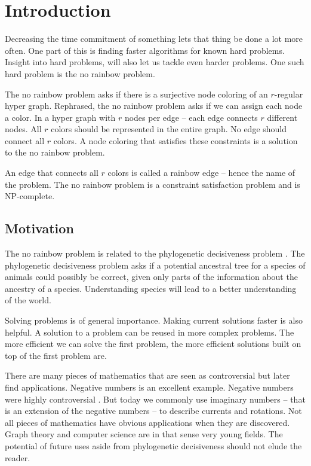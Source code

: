 \documentclass[msc,lith,english]{liuthesis}
\author{Edvard Thörnros}
\begin{document}
\chapter{Introduction}
\label{chaIntro}
Decreasing the time commitment of something lets that thing be done a lot more often.
One part of this is finding faster algorithms for known hard problems.
Insight into hard problems, will also let us tackle even harder problems.
One such hard problem is the no rainbow problem.

The no rainbow problem \cite{sourceNoRainbow} asks if there is a surjective node coloring of an $r$-regular hyper graph.
Rephrased, the no rainbow problem asks if we can assign each node a color.
In a hyper graph with $r$ nodes per edge -- each edge connects $r$ different nodes.
All $r$ colors should be represented in the entire graph.
No edge should connect all $r$ colors.
A node coloring that satisfies these constraints is a solution to the no rainbow problem.

An edge that connects all $r$ colors is called a rainbow edge -- hence the name of the problem.
The no rainbow problem is a constraint satisfaction problem and is NP-complete.

\section{Motivation}
The no rainbow problem is related to the phylogenetic decisiveness problem \cite{sourceNoRainbow}\cite{sourcePhylogeneticDecisiveness}. The
phylogenetic decisiveness problem asks if a potential ancestral tree for a
species of animals could possibly be correct, given only parts of the
information about the ancestry of a species.
Understanding species will lead to a better understanding of the world.  

Solving problems is of general importance. Making current solutions faster is also helpful.
A solution to a problem can be reused in more complex problems. The more
efficient we can solve the first problem, the more efficient solutions built on
top of the first problem are. 

There are many pieces of mathematics that are seen as controversial but later find applications.
Negative numbers is an excellent example. Negative numbers were highly
controversial \cite{sourceNeg}. But today we commonly use imaginary numbers -- that is an extension of the negative numbers -- to
describe currents and rotations. Not all pieces of mathematics have obvious
applications when they are discovered. Graph theory and computer science are in
that sense very young fields.
The potential of future uses aside from phylogenetic decisiveness should not elude the reader.
\end{document}
